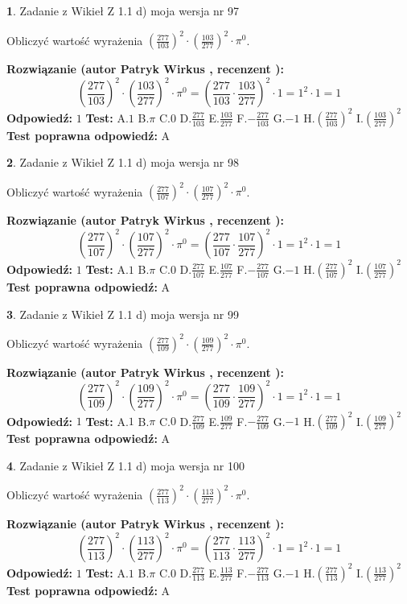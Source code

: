 \documentclass[12pt, a4paper]{article}
\theoremstyle{definition} %
\newtheorem{zad}{}
\newcommand{\zadStart}[1]{\begin{zad}#1\newline}
\newcommand{\zadStop}{\end{zad}}
\newcommand{\rozwStart}[2]{\noindent \textbf{Rozwiązanie (autor #1 , recenzent #2): }\newline}
\newcommand{\rozwStop}{\newline}
\newcommand{\odpStart}{\noindent \textbf{Odpowiedź:}\newline}
\newcommand{\odpStop}{\newline}
\newcommand{\testStart}{\noindent \textbf{Test:}\newline}
\newcommand{\testStop}{\newline}
\newcommand{\kluczStart}{\noindent \textbf{Test poprawna odpowiedź:}\newline}
\newcommand{\kluczStop}{\newline}
\begin{document}
\zadStart{Zadanie z Wikieł Z 1.1 d) moja wersja nr 97}

Obliczyć wartość wyrażenia $(\frac{277}{103})^{2} \cdot (\frac{103}{277})^{2} \cdot \pi^{0}$.
\zadStop
\rozwStart{Patryk Wirkus}{}
$$(\frac{277}{103})^{2} \cdot (\frac{103}{277})^{2} \cdot \pi^{0} = (\frac{277}{103} \cdot \frac{103}{277})^{2} \cdot 1 = 1^{2} \cdot 1 = 1$$
\rozwStop
\odpStart
$1$
\odpStop
\testStart
A.$1$ B.$\pi$ C.$0$ D.$\frac{277}{103}$ E.$\frac{103}{277}$
F.$-\frac{277}{103}$ G.$-1$
H.$(\frac{277}{103})^{2}$
I.$(\frac{103}{277})^{2}$
\testStop
\kluczStart
A
\kluczStop



\zadStart{Zadanie z Wikieł Z 1.1 d) moja wersja nr 98}

Obliczyć wartość wyrażenia $(\frac{277}{107})^{2} \cdot (\frac{107}{277})^{2} \cdot \pi^{0}$.
\zadStop
\rozwStart{Patryk Wirkus}{}
$$(\frac{277}{107})^{2} \cdot (\frac{107}{277})^{2} \cdot \pi^{0} = (\frac{277}{107} \cdot \frac{107}{277})^{2} \cdot 1 = 1^{2} \cdot 1 = 1$$
\rozwStop
\odpStart
$1$
\odpStop
\testStart
A.$1$ B.$\pi$ C.$0$ D.$\frac{277}{107}$ E.$\frac{107}{277}$
F.$-\frac{277}{107}$ G.$-1$
H.$(\frac{277}{107})^{2}$
I.$(\frac{107}{277})^{2}$
\testStop
\kluczStart
A
\kluczStop



\zadStart{Zadanie z Wikieł Z 1.1 d) moja wersja nr 99}

Obliczyć wartość wyrażenia $(\frac{277}{109})^{2} \cdot (\frac{109}{277})^{2} \cdot \pi^{0}$.
\zadStop
\rozwStart{Patryk Wirkus}{}
$$(\frac{277}{109})^{2} \cdot (\frac{109}{277})^{2} \cdot \pi^{0} = (\frac{277}{109} \cdot \frac{109}{277})^{2} \cdot 1 = 1^{2} \cdot 1 = 1$$
\rozwStop
\odpStart
$1$
\odpStop
\testStart
A.$1$ B.$\pi$ C.$0$ D.$\frac{277}{109}$ E.$\frac{109}{277}$
F.$-\frac{277}{109}$ G.$-1$
H.$(\frac{277}{109})^{2}$
I.$(\frac{109}{277})^{2}$
\testStop
\kluczStart
A
\kluczStop



\zadStart{Zadanie z Wikieł Z 1.1 d) moja wersja nr 100}

Obliczyć wartość wyrażenia $(\frac{277}{113})^{2} \cdot (\frac{113}{277})^{2} \cdot \pi^{0}$.
\zadStop
\rozwStart{Patryk Wirkus}{}
$$(\frac{277}{113})^{2} \cdot (\frac{113}{277})^{2} \cdot \pi^{0} = (\frac{277}{113} \cdot \frac{113}{277})^{2} \cdot 1 = 1^{2} \cdot 1 = 1$$
\rozwStop
\odpStart
$1$
\odpStop
\testStart
A.$1$ B.$\pi$ C.$0$ D.$\frac{277}{113}$ E.$\frac{113}{277}$
F.$-\frac{277}{113}$ G.$-1$
H.$(\frac{277}{113})^{2}$
I.$(\frac{113}{277})^{2}$
\testStop
\kluczStart
A
\kluczStop
\end{document}
